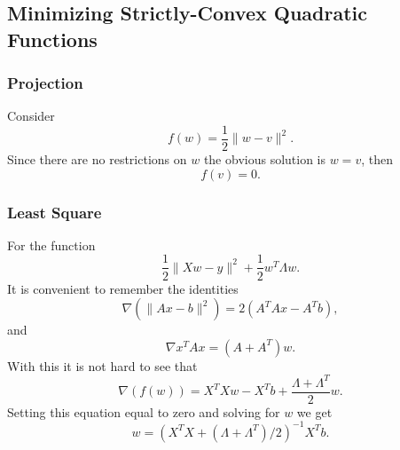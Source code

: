 \documentclass[11pt]{article}
\theoremstyle{plain}
\begin{document}
\subsection{Minimizing Strictly-Convex Quadratic Functions}

\subsubsection{Projection}
Consider
\begin{equation*}
f(w)=\frac{1}{2}\|w-v\|^{2}.
\end{equation*}
Since there are no restrictions on $w$ the obvious solution is $w=v$, then
\begin{equation*}
f(v)=0.
\end{equation*}

\subsubsection{Least Square}
For the function
\begin{equation*}
\frac{1}{2}\|Xw-y\|^{2}+\frac{1}{2}w^{T}\Lambda w.
\end{equation*}
It is convenient to remember the identities 
\begin{equation}\label{eqnnicenorm}
\nabla(\|Ax-b\|^{2})=2(A^{T}Ax-A^{T}b),
\end{equation}
and
\begin{equation*}
\nabla x^{T}Ax=(A+A^{T})w.
\end{equation*}
With this it is not hard to see that
\begin{equation*}
\nabla(f(w))=X^{T}Xw-X^{T}b+\frac{\Lambda+\Lambda^{T}}{2}w.
\end{equation*}
Setting this equation equal to zero and solving for $w$ we get
\begin{equation*}
w=\left(X^{T}X+(\Lambda+\Lambda^{T})/2\right)^{-1}X^{T}b.
\end{equation*}
\end{document}

